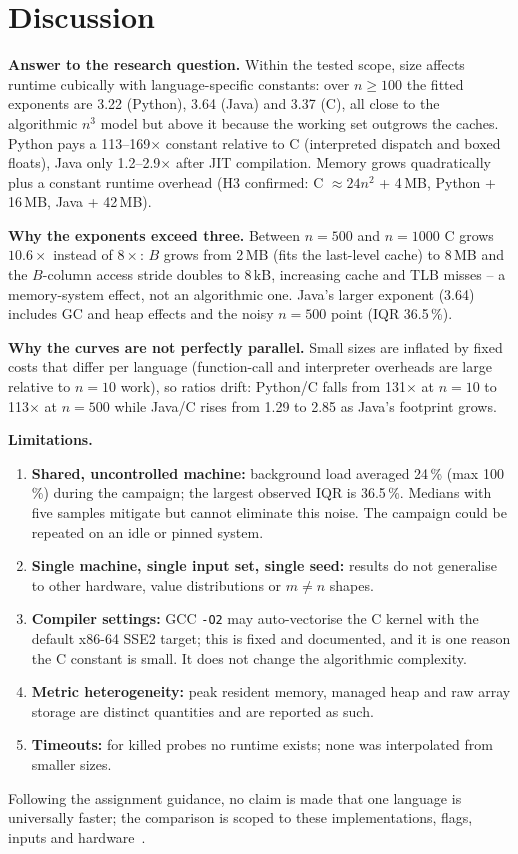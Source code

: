 \documentclass[11pt,a4paper]{article}
\begin{document}
\section{Discussion}
\label{sec:discussion}

\textbf{Answer to the research question.} Within the tested scope, size affects
runtime cubically with language-specific constants: over $n \ge 100$ the fitted
exponents are 3.22 (Python), 3.64 (Java) and 3.37 (C), all close to the
algorithmic $n^3$ model but above it because the working set outgrows the caches.
Python pays a 113--169$\times$ constant relative to C (interpreted dispatch and
boxed floats), Java only 1.2--2.9$\times$ after JIT compilation. Memory grows
quadratically plus a constant runtime overhead (H3 confirmed: C $\approx 24n^2$ +
4\,MB, Python + 16\,MB, Java + 42\,MB).

\textbf{Why the exponents exceed three.} Between $n=500$ and $n=1000$ C grows
$10.6\times$ instead of $8\times$: $B$ grows from 2\,MB (fits the last-level
cache) to 8\,MB and the $B$-column access stride doubles to 8\,kB, increasing
cache and TLB misses -- a memory-system effect, not an algorithmic one. Java's
larger exponent (3.64) includes GC and heap effects and the noisy $n=500$ point
(IQR 36.5\,\%).

\textbf{Why the curves are not perfectly parallel.} Small sizes are inflated by
fixed costs that differ per language (function-call and interpreter overheads are
large relative to $n=10$ work), so ratios drift: Python/C falls from 131$\times$
at $n=10$ to 113$\times$ at $n=500$ while Java/C rises from 1.29 to 2.85 as
Java's footprint grows.

\textbf{Limitations.}
\begin{enumerate}
  \item \textbf{Shared, uncontrolled machine:} background load averaged 24\,\%
        (max 100\,\%) during the campaign; the largest observed IQR is 36.5\,\%.
        Medians with five samples mitigate but cannot eliminate this noise.
        The campaign could be repeated on an idle or pinned system.
  \item \textbf{Single machine, single input set, single seed:} results do not
        generalise to other hardware, value distributions or $m \ne n$ shapes.
  \item \textbf{Compiler settings:} GCC \texttt{-O2} may auto-vectorise the C
        kernel with the default x86-64 SSE2 target; this is fixed and documented,
        and it is one reason the C constant is small. It does not change the
        algorithmic complexity.
  \item \textbf{Metric heterogeneity:} peak resident memory, managed heap and raw
        array storage are distinct quantities and are reported as such.
  \item \textbf{Timeouts:} for killed probes no runtime exists; none was
        interpolated from smaller sizes.
\end{enumerate}
Following the assignment guidance, no claim is made that one language is
universally faster; the comparison is scoped to these implementations, flags,
inputs and hardware~\cite{fleming1986,mytkowicz2009}.
\end{document}
